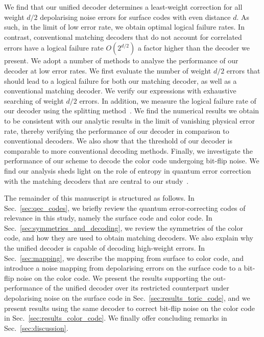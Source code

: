 \documentclass[a4paper,twocolumn,11pt,accepted=2024-12-23]{quantumarticle}
\begin{document}
We find that our unified decoder determines a least-weight correction for all weight $d/2$ depolarising noise errors for surface codes with even distance $d$. As such, in the limit of low error rate, we obtain optimal logical failure rates. In contrast, conventional matching decoders that do not account for correlated errors have a logical failure rate $O(2^{d/2})$ a factor higher than the decoder we present. We adopt a number of methods to analyse the performance of our decoder at low error rates. We first evaluate the number of weight $d/2$ errors that should lead to a logical failure for both our matching decoder, as well as a conventional matching decoder. We verify our expressions with exhaustive searching of weight $d/2$ errors. In addition, we measure the logical failure rate of our decoder using the splitting method~\cite{BENNETT1976, Bravyi_2013}. We find the numerical results we obtain to be consistent with our analytic results in the limit of vanishing physical error rate, thereby verifying the performance of our decoder in comparison to conventional decoders.
We also show that the threshold of our decoder is comparable to more conventional decoding methods. Finally, we investigate the performance of our scheme to decode the color code undergoing bit-flip noise. We find our analysis sheds light on the role of entropy in quantum error correction with the matching decoders that are central to our study~\cite{stace2010error, criger2018multi, beverland2019role}.



The remainder of this manuscript is structured as follows. In Sec.~\ref{sec:qec_codes}, we briefly review the quantum error-correcting codes of relevance in this study, namely the surface code and color code. In Sec.~\ref{sec:symmetries_and_decoding}, we review the symmetries of the color code, and how they are used to obtain matching decoders. We also explain why the unified decoder is capable of decoding high-weight errors. In Sec.~\ref{sec:mapping}, we describe the mapping from surface to color code, and introduce a noise mapping from depolarising errors on the surface code to a bit-flip noise on the color code. We present the results supporting the out-performance of the unified decoder over its restricted counterpart under depolarising noise on the surface code in Sec.~\ref{sec:results_toric_code}, and we present results using the same decoder to correct bit-flip noise on the color code in Sec.~\ref{sec:results_color_code}. We finally offer concluding remarks in Sec.~\ref{sec:discussion}.
\end{document}
